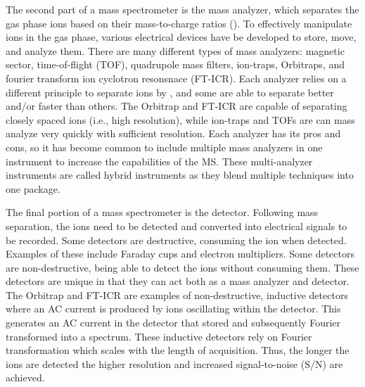 The second part of a mass spectrometer is the mass analyzer, which separates the gas phase ions based on their mass-to-charge ratios (\mz{}). To effectively manipulate ions in the gas phase, various electrical devices have be developed to store, move, and analyze them. There are many different types of mass analyzers: magnetic sector, time-of-flight (TOF), quadrupole mass filters, ion-traps\cite{iontrap}, Orbitraps\cite{orbitrap}, and fourier transform ion cyclotron resonsnace (FT-ICR)\cite{fticr}. Each analyzer relies on a different principle to separate ions by \mz{}, and some are able to separate better and/or faster than others. The Orbitrap and FT-ICR are capable of separating closely spaced \mz{} ions (i.e., high resolution), while ion-traps and TOFs are can mass analyze very quickly with sufficient resolution. Each analyzer has its pros and cons, so it has become common to include multiple mass analyzers in one instrument to increase the capabilities of the MS. These multi-analyzer instruments are called hybrid instruments as they blend multiple techniques into one package.

The final portion of a mass spectrometer is the detector. Following mass separation, the ions need to be detected and converted into electrical signals to be recorded. Some detectors are destructive, consuming the ion when detected. Examples of these include Faraday cups and electron multipliers. Some detectors are non-destructive, being able to detect the ions without consuming them. These detectors are unique in that they can act both as a mass analyzer and detector. The Orbitrap and FT-ICR are examples of non-destructive, inductive detectors where an AC current is produced by ions oscillating within the detector. This generates an AC current in the detector that stored and subsequently Fourier transformed into a \mz{} spectrum. These inductive detectors rely on Fourier transformation which scales with the length of acquisition. Thus, the longer the ions are detected the higher resolution and increased signal-to-noise (S/N) are achieved.

